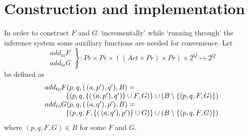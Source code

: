 \section{Construction and implementation}
In order to construct $F$ and $G$ `incrementally' while `running through' the inference system some auxiliary functions are needed for convenience. Let
\[
\left.\begin{array}{l}
add_{to}F\\
add_{to}G
\end{array}\right\} : Pr\times Pr\times((Act\times Pr)\times Pr)\times 2^Q \mapsto 2^Q
\]
be defined as
\[
\begin{array}{llll}
\multicolumn{4}{l}{add_{to}F(p,q,(\,(a,p'),q'),B) =}\\
&&& \{(p,q,\{(\,(a,p'),q')\}\cup F,G)\}\cup (B\setminus \{(p,q,F,G)\})\\
\multicolumn{4}{l}{add_{to}G(p,q,(\,(a,q'),p'),B) =}\\
&&& \{(p,q,F,\{(\,(a,q'),p')\}\cup G)\}\cup (B\setminus \{(p,q,F,G)\})\\
\end{array}
\]
where $(p,q,F,G)\in B$ for some $F$ and $G$.

